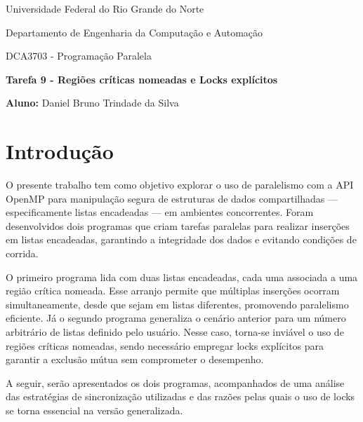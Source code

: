 \documentclass[a4paper, 12pt]{article}
\begin{document}
	\begin{center}
		Universidade Federal do Rio Grande do Norte
		
		Departamento de Engenharia da Computação e Automação
		
		DCA3703 - Programação Paralela
		
		\textbf{Tarefa 9 - Regiões críticas nomeadas e Locks explícitos}
		
		\textbf{Aluno:} Daniel Bruno Trindade da Silva
	\end{center}
	
	\section{Introdução}
	O presente trabalho tem como objetivo explorar o uso de paralelismo com a API OpenMP para manipulação segura de estruturas de dados compartilhadas — especificamente listas encadeadas — em ambientes concorrentes. Foram desenvolvidos dois programas que criam tarefas paralelas para realizar inserções em listas encadeadas, garantindo a integridade dos dados e evitando condições de corrida.
	
	O primeiro programa lida com duas listas encadeadas, cada uma associada a uma região crítica nomeada. Esse arranjo permite que múltiplas inserções ocorram simultaneamente, desde que sejam em listas diferentes, promovendo paralelismo eficiente. Já o segundo programa generaliza o cenário anterior para um número arbitrário de listas definido pelo usuário. Nesse caso, torna-se inviável o uso de regiões críticas nomeadas, sendo necessário empregar locks explícitos para garantir a exclusão mútua sem comprometer o desempenho.
	
	A seguir, serão apresentados os dois programas, acompanhados de uma análise das estratégias de sincronização utilizadas e das razões pelas quais o uso de locks se torna essencial na versão generalizada.

	
	
\end{document}
